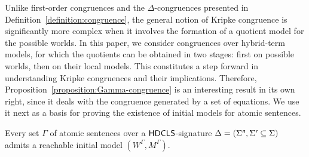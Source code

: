 \documentclass[a4paper,UKenglish,cleveref,autoref]{lipics-v2019}
\begin{document}
Unlike first-order congruences and the \(\Delta\)-congruences presented in Definition~\ref{definition:congruence}, the general notion of Kripke congruence is significantly more complex when it involves the formation of a quotient model for the possible worlds.
In this paper, we consider congruences over hybrid-term models, for which the quotients can be obtained in two stages: first on possible worlds, then on their local models.
This constitutes a step forward in understanding Kripke congruences and their implications.
Therefore, Proposition~\ref{proposition:Gamma-congruence} is an interesting result in its own right, since it deals with the congruence generated by a set of equations.
We use it next as a basis for proving the existence of initial models for atomic sentences.

\begin{theorem} 
  \label{theorem:HDCLS0-initiality}
  Every set\/ \(\Gamma\) of atomic sentences over a \({\mathsf{HDCLS}}\)-signature \(\Delta = (\Sigma^{\text{\normalfont\sffamily\itshape n}}, \Sigma^{\text{\normalfont\sffamily\itshape r}} \subseteq \Sigma)\) admits a reachable initial model \((W^{\Gamma}, M^{\Gamma})\).
\end{theorem}
\end{document}
